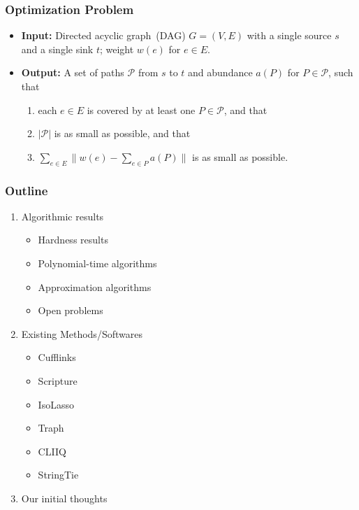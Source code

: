 \frame
{
	\frametitle{Optimization Problem}

	\begin{itemize}
	\item {\bf Input:} Directed acyclic graph~(DAG) $G=(V,E)$ with a single source $s$ and a single sink $t$;
		weight $w(e)$ for $e\in E$.

	\vspace{0.2cm}

	\item {\bf Output:} A set of paths $\mathcal{P}$ from $s$ to $t$ and abundance $a(P)$ for $P\in\mathcal{P}$, such that
		\begin{enumerate}
		\item each $e\in E$ is covered by at least one $P\in\mathcal{P}$, and that
		\item $|\mathcal{P}|$ is as small as possible, and that
		\item $\sum_{e\in E} \|w(e) - \sum_{e\in P} a(P)\|$ is as small as possible.
		\end{enumerate}
	\end{itemize}

	\vspace{1.0cm}
	
	\vspace{1.0cm}
}

\frame
{
	\frametitle{Outline}
	\begin{enumerate}
	\item Algorithmic results
		\begin{itemize}
		\item Hardness results
		\item Polynomial-time algorithms
		\item Approximation algorithms
		\item Open problems
		\end{itemize}
	\item Existing Methods/Softwares
		\begin{itemize}
		\item Cufflinks
		\item Scripture
		\item IsoLasso
		\item Traph
		\item CLIIQ
		\item StringTie
		\end{itemize}
	\item Our initial thoughts
	\end{enumerate}
}



